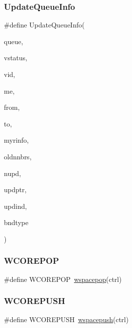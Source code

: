 \subsubsection{\texorpdfstring{Update\+Queue\+Info}{UpdateQueueInfo}}
{\footnotesize\ttfamily \#define Update\+Queue\+Info(\begin{DoxyParamCaption}\item[{}]{queue,  }\item[{}]{vstatus,  }\item[{}]{vid,  }\item[{}]{me,  }\item[{}]{from,  }\item[{}]{to,  }\item[{}]{myrinfo,  }\item[{}]{oldnnbrs,  }\item[{}]{nupd,  }\item[{}]{updptr,  }\item[{}]{updind,  }\item[{}]{bndtype }\end{DoxyParamCaption})}

\mbox{\label{a00921_a213331e15c4859c51ae85a9f45dc4403}} 
\subsubsection{\texorpdfstring{W\+C\+O\+R\+E\+P\+OP}{WCOREPOP}}
{\footnotesize\ttfamily \#define W\+C\+O\+R\+E\+P\+OP~\hyperlink{a00981_ad26c08175b8b18d7dfb86f2f8d91b09e}{wspacepop}(ctrl)}

\mbox{\label{a00921_a76445c109da4a1f7bdf538f71922446b}} 
\subsubsection{\texorpdfstring{W\+C\+O\+R\+E\+P\+U\+SH}{WCOREPUSH}}
{\footnotesize\ttfamily \#define W\+C\+O\+R\+E\+P\+U\+SH~\hyperlink{a00981_a90d838f5af71d196b117d443432e4646}{wspacepush}(ctrl)}

